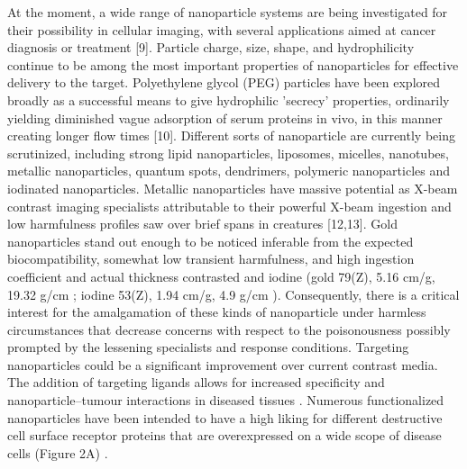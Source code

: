 \documentclass[12pt]{article}
\begin{document}
At the moment, a wide range of nanoparticle systems are being investigated for their possibility in cellular imaging, with several applications aimed at cancer diagnosis or treatment [9]. Particle charge, size, shape, and hydrophilicity continue to be among the most important properties of nanoparticles for effective delivery to the target. Polyethylene glycol (PEG) particles have been explored broadly as a successful means to give hydrophilic 'secrecy' properties, ordinarily yielding diminished vague adsorption of serum proteins in vivo, in this manner creating longer flow times [10]. Different sorts of nanoparticle are currently being scrutinized, including strong lipid nanoparticles, liposomes, micelles, nanotubes, metallic nanoparticles, quantum spots, dendrimers, polymeric nanoparticles and iodinated nanoparticles. Metallic nanoparticles have massive potential as X-beam contrast imaging specialists attributable to their powerful X-beam ingestion and low harmfulness profiles saw over brief spans in creatures [12,13]. Gold nanoparticles stand out enough to be noticed inferable from the expected biocompatibility, somewhat low transient harmfulness, and high ingestion coefficient and actual thickness contrasted and iodine (gold 79(Z), 5.16 cm/g, 19.32 g/cm ; iodine 53(Z), 1.94 cm/g, 4.9 g/cm ). Consequently, there is a critical interest for the amalgamation of these kinds of nanoparticle under harmless circumstances that decrease concerns with respect to the poisonousness possibly prompted by the lessening specialists and response conditions. Targeting nanoparticles could be a significant improvement over current contrast media. The addition of targeting ligands allows for increased specificity and nanoparticle–tumour interactions in diseased tissues . Numerous functionalized nanoparticles have been intended to have a high liking for different destructive cell surface receptor proteins that are overexpressed on a wide scope of disease cells (Figure 2A) .\\
\end{document}
